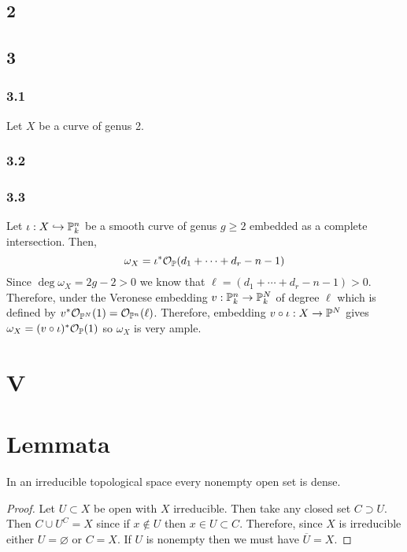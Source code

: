 \documentclass[12pt]{article}
\begin{document}
\subsection{2}

\subsection{3}

\subsubsection{3.1}

Let $X$ be a curve of genus 2.

\subsubsection{3.2}

\subsubsection{3.3}

Let $\iota : X \embed \P^n_k$ be a smooth curve of genus $g \ge 2$ embedded as a complete intersection. Then,
\[ \omega_X = \iota^* \struct{\P}(d_1 + \cdots + d_r - n - 1) \]
Since $\deg{\omega_X} = 2 g - 2 > 0$ we know that $\ell = (d_1 + \cdots + d_r - n - 1) > 0$. Therefore, under the Veronese embedding $v : \P^n_k \to \P^N_k$ of degree $\ell$ which is defined by $v^* \struct{\P^{N}}(1) = \struct{\P^n}(\ell)$. Therefore, embedding $v \circ \iota : X \to \P^N$ gives $\omega_X = (v \circ \iota)^* \struct{\P}(1)$ so $\omega_X$ is very ample. 



\section{V}

\section{Lemmata}


\begin{lemma} \label{open_in_irreducible_is_dense}
In an irreducible topological space every nonempty open set is dense.
\end{lemma}

\begin{proof}
Let $U \subset X$ be open with $X$ irreducible. Then take any closed set $C \supset U$. Then $C \cup U^C = X$ since if $x \notin U$ then $x \in U \subset C$. Therefore, since $X$ is irreducible either $U = \varnothing$ or $C = X$. If $U$ is nonempty then we must have $\overline{U} = X$.  
\end{proof}
\end{document}
